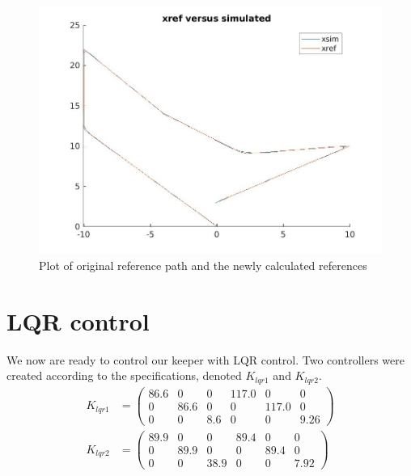\documentclass[•]{article}
\begin{document}
\begin{figure}[H]
\centering
\includegraphics[width=.8\textwidth]{xrefstates.jpg}
\caption{Plot of original reference path and the newly calculated references}
\end{figure}

\section{LQR control}
We now are ready to control our keeper with LQR control. Two controllers were created according to the specifications, denoted $K_{lqr1}$ and $K_{lqr2}$. 
\begin{align*}
K_{lqr1} &= \left(\begin{array}{cccccc} 86.6 & 0 & 0 & 117.0 & 0 & 0\\ 0 & 86.6 & 0 & 0 & 117.0 & 0\\ 0 & 0 & 8.6 & 0 & 0 & 9.26 \end{array}\right) \\ K_{lqr2}&= \left(\begin{array}{cccccc} 89.9 & 0 & 0 & 89.4 & 0 & 0\\ 0 & 89.9 & 0 & 0 & 89.4 & 0\\ 0 & 0 & 38.9 & 0 & 0 & 7.92 \end{array}\right)
\end{align*}
\end{document}
